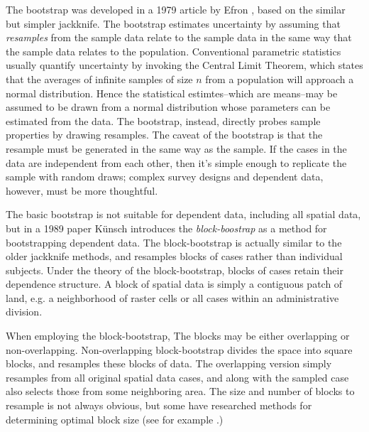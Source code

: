 \documentclass[draft]{article}
\begin{document}
The bootstrap was developed in a 1979 article by Efron \cite{efron79}, based on the similar but simpler jackknife.  The bootstrap estimates uncertainty by assuming that {\em resamples} from the sample data relate to the sample data in the same way that the sample data relates to the population.  Conventional parametric statistics usually quantify uncertainty by invoking the Central Limit Theorem, which states that the averages of infinite samples of size $n$ from a population will approach a normal distribution.  Hence the statistical estimtes--which are means--may be assumed to be drawn from a normal distribution whose parameters can be estimated from the data.  The bootstrap, instead, directly probes sample properties by drawing resamples.  The caveat of the bootstrap is that the resample must be generated in the same way as the sample.  If the cases in the data are independent from each other, then it's simple enough to replicate the sample with random draws; complex survey designs and dependent data, however, must be more thoughtful.

The basic bootstrap is not suitable for dependent data, including all spatial data, but in a 1989 paper K\"{u}nsch \cite{kunsch89} introduces the {\em block-boostrap} as a method for bootstrapping dependent data.  The block-bootstrap is actually similar to the older jackknife methods, and resamples blocks of cases rather than individual subjects.  %
Under the theory of the block-bootstrap, blocks of cases retain their dependence structure.  A block of spatial data is simply a contiguous patch of land, e.g. a neighborhood of raster cells or all cases within an administrative division.

When employing the block-bootstrap, The blocks may be either overlapping or non-overlapping.  Non-overlapping block-bootstrap divides the space into square blocks, and resamples these blocks of data.  The overlapping version simply resamples from all original spatial data cases, and along with the sampled case also selects those from some neighboring area.  The size and number of blocks to resample is not always obvious, but some have researched methods for determining optimal block size (see for example \cite{nordman07}.)
\end{document}
